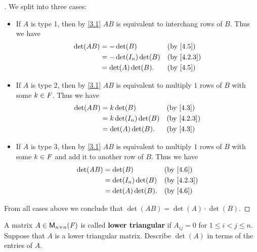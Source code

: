 \begin{proof}[]
  We split into three cases:
  \begin{itemize}
    \item If \(A\) is type 1, then by \cref{3.1} \(AB\) is equivalent to interchang rows of \(B\).
          Thus we have
          \begin{align*}
            \det(AB) & = -\det(B)           &  & \text{(by \cref{4.5})}   \\
                     & = -\det(I_n) \det(B) &  & \text{(by \cref{4.2.3})} \\
                     & = \det(A) \det(B).   &  & \text{(by \cref{4.5})}
          \end{align*}
    \item If \(A\) is type 2, then by \cref{3.1} \(AB\) is equivalent to multiply \(1\) rows of \(B\) with some \(k \in \mathit{F}\).
          Thus we have
          \begin{align*}
            \det(AB) & = k \det(B)           &  & \text{(by \cref{4.3})}   \\
                     & = k \det(I_n) \det(B) &  & \text{(by \cref{4.2.3})} \\
                     & = \det(A) \det(B).    &  & \text{(by \cref{4.3})}
          \end{align*}
    \item If \(A\) is type 3, then by \cref{3.1} \(AB\) is equivalent to multiply \(1\) rows of \(B\) with some \(k \in \mathit{F}\) and add it to another row of \(B\).
          Thus we have
          \begin{align*}
            \det(AB) & = \det(B)           &  & \text{(by \cref{4.6})}   \\
                     & = \det(I_n) \det(B) &  & \text{(by \cref{4.2.3})} \\
                     & = \det(A) \det(B).  &  & \text{(by \cref{4.6})}
          \end{align*}
  \end{itemize}
  From all cases above we conclude that \(\det(AB) = \det(A) \cdot \det(B)\).
\end{proof}

\begin{ex}\label{ex:4.3.19}
  A matrix \(A \in \mathsf{M}_{{n} \times n}({\mathit{F}})\) is called \textbf{lower triangular} if \(A_{i j} = 0\) for \(1 \leq i < j \leq n\).
  Suppose that \(A\) is a lower triangular matrix.
  Describe \(\det(A)\) in terms of the entries of \(A\).
\end{ex}

